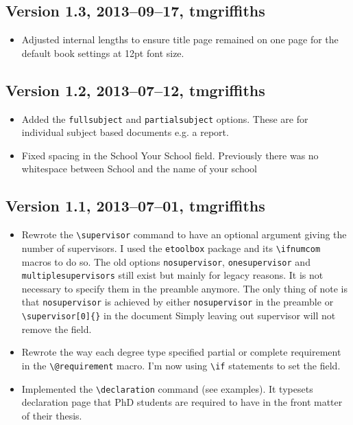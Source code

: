 \documentclass[12pt,oneside]{article}
\newcommand{\option}[1]{\texttt{\color{UOWblue}#1}}
\newcommand{\command}[1]{\texttt{\color{UOWred}#1}}
\newcommand{\comoptions}[1]{\texttt{\color{UOWdarkblue}#1}}
\begin{document}
\subsection*{Version 1.3, 2013–09–17, tmgriffiths}
\begin{itemize}
    \item Adjusted internal lengths to ensure title page remained on one page for the default book settings at 12pt font size.
\end{itemize}

\subsection*{Version 1.2, 2013–07–12, tmgriffiths}
\begin{itemize}
    \item Added the \option{fullsubject} and \option{partialsubject} options. These are for individual subject based documents e.g. a report.
    \item Fixed spacing in the School Your School field. Previously there was no whitespace between School and the name of your school
\end{itemize}    
\subsection*{Version 1.1, 2013–07–01, tmgriffiths}
\begin{itemize}
    \item Rewrote the \command{\textbackslash{}supervisor} command to have an optional argument giving the number of supervisors. I used the \texttt{etoolbox} package and its \texttt{\textbackslash{}ifnumcom} macros to do so. The old options \option{nosupervisor}, \option{onesupervisor} and \option{multiplesupervisors} still exist but mainly for legacy reasons. It is not necessary to specify them in the preamble anymore. The only thing of note is that \option{nosupervisor} is achieved by either \option{nosupervisor} in the preamble or \command{\textbackslash{}supervisor}\comoptions{\texttt{[0]\{\}}} in the document Simply leaving out supervisor will not remove the field.
    \item Rewrote the way each degree type specified partial or complete requirement in the \command{\textbackslash{}@requirement} macro. I'm now using \texttt{\textbackslash{}if} statements to set the field.
    \item Implemented the \command{\textbackslash{}declaration} command (see examples). It typesets declaration page that PhD students are required to have in the front matter of their thesis.
\end{itemize}
\end{document}
